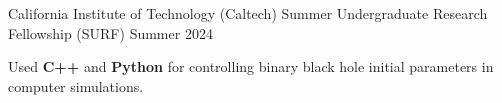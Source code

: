 \begin{entry}{California Institute of Technology (Caltech)}
	\entryItem
		{Summer Undergraduate Research Fellowship (SURF)}
		{Summer 2024}

		\begin{items}
			\item Used \textbf{C++} and \textbf{Python} for controlling binary black hole initial parameters in computer simulations.
		\end{items}
\end{entry}
